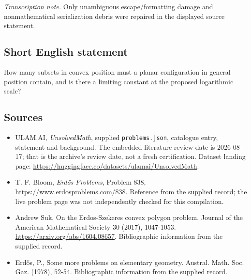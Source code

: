 \documentclass[11pt,a4paper]{article}
\begin{document}
{\small\emph{Transcription note.} Only unambiguous escape/formatting damage and nonmathematical serialization debris were repaired in the displayed source statement.}

\subsection{Short English statement}

How many subsets in convex position must a planar configuration in general position contain, and is there a limiting constant at the proposed logarithmic scale?

\subsection{Sources}

{\small

\begin{itemize}

\item[\hypertarget{source:statement:1}{S1}] ULAM.AI, \emph{UnsolvedMath}, supplied \texttt{problems.json}, catalogue entry, statement and background. The embedded literature-review date is 2026-08-17; that is the archive’s review date, not a fresh certification. Dataset landing page: \url{https://huggingface.co/datasets/ulamai/UnsolvedMath}.

\item[\hypertarget{source:statement:2}{S2}] T. F. Bloom, \emph{Erdős Problems}, Problem 838, \url{https://www.erdosproblems.com/838}. Reference from the supplied record; the live problem page was not independently checked for this compilation.

\item[\hypertarget{source:statement:3}{S3}] Andrew Suk, On the Erdos-Szekeres convex polygon problem, Journal of the American Mathematical Society 30 (2017), 1047-1053. \url{https://arxiv.org/abs/1604.08657}. Bibliographic information from the supplied record.

\item[\hypertarget{source:statement:4}{S4}] Erd\H{o}s, P., Some more problems on elementary geometry. Austral. Math. Soc. Gaz. (1978), 52-54. Bibliographic information from the supplied record.

\end{itemize}

}

\label{end:statement}
\end{document}
